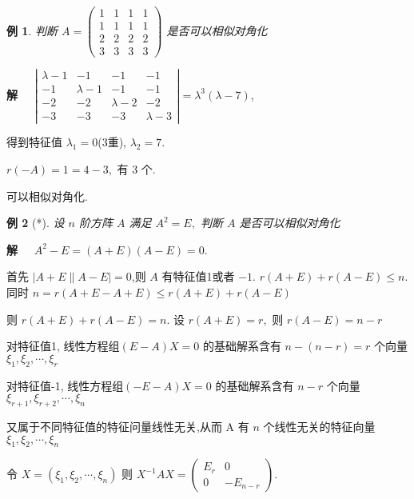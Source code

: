 \documentclass[13pt]{beamer}
\newtheorem{exa}{例}
\def\sol{{\bf 解~~ }}
\begin{document}
\begin{frame}
\begin{exa}
判断 $A=\left(\begin{array}{cccc}1 & 1 & 1 & 1 \\ 1 & 1 & 1 & 1 \\ 2 & 2 & 2 & 2 \\ 3 & 3 & 3 & 3\end{array}\right)$ 是否可以相似对角化
\end{exa} 
\sol 
$\left|\begin{array}{cccc}\lambda-1 & -1 & -1 & -1 \\ -1 & \lambda-1 & -1 & -1 \\ -2 & -2 & \lambda-2 & -2 \\ -3 & -3 & -3 & \lambda-3\end{array}\right| 
=\lambda^{3}(\lambda-7)$,

得到特征值 $\lambda_{1}=0$(3重), $\lambda_{2}=7$.

$r(-A)=1=4-3,$ 有 3 个.

可以相似对角化.
\end{frame}



\begin{frame}
\begin{exa}[*]
设 $n$ 阶方阵 $A$ 满足 $A^{2}=E,$ 判断 $A$ 是否可以相似对角化
\end{exa}
\sol $A^{2}-E=(A+E)(A-E)=0$.

首先 $|A+E \| A-E|=0$,则 $A$ 有特征值1或者 $-1 .$
$r(A+E)+r(A-E) \leq n$.同时 $n=r(A+E-A+E) \leq r(A+E)+r(A-E)$

则 $r(A+E)+r(A-E)=n .$ 设 $r(A+E)=r,$ 则 $r(A-E)=n-r$

对特征值1, 线性方程组$(E-A) X=0$ 的基础解系含有 $n-(n-r)=r$ 个向量 $\xi_{1}, \xi_{2}, \cdots, \xi_{r}$

对特征值-1, 线性方程组$(-E-A) X=0$ 的基础解系含有 $n-r$ 个向量 $\xi_{r+1}, \xi_{r+2}, \cdots, \xi_{n}$

又属于不同特征值的特征问量线性无关,从而 A 有 $n$ 个线性无关的特征向量 $\xi_{1}, \xi_{2}, \cdots, \xi_{n}$

令 $X=\left(\xi_{1}, \xi_{2}, \cdots, \xi_{n}\right)$ 则 $X^{-1} A X=\left(\begin{array}{cc}E_{r} & 0 \\ 0 & -E_{n-r}\end{array}\right).$
\end{frame}
\end{document}
